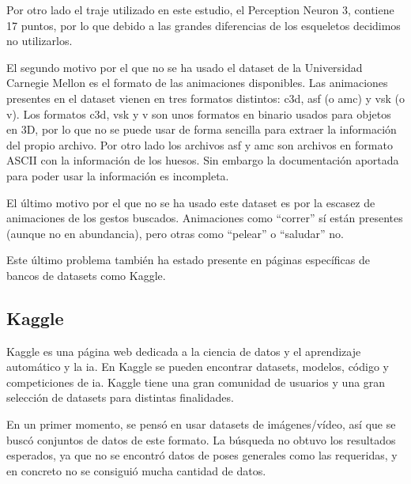 Por otro lado el traje utilizado en este estudio, el Perception Neuron 3, contiene 17 puntos, por lo que debido a las grandes diferencias de los esqueletos decidimos no utilizarlos.

El segundo motivo por el que no se ha usado el dataset de la Universidad Carnegie Mellon es el formato de las animaciones disponibles.
Las animaciones presentes en el dataset vienen en tres formatos distintos: c3d, asf (o amc) y vsk (o v).
Los formatos c3d, vsk y v son unos formatos en binario usados para objetos en 3D, por lo que no se puede usar de forma sencilla para extraer la información del propio archivo.
Por otro lado los archivos asf y amc son archivos en formato ASCII con la información de los huesos. Sin embargo la documentación aportada para poder usar la información es incompleta.

El último motivo por el que no se ha usado este dataset es por la escasez de animaciones de los gestos buscados.
Animaciones como ``correr'' sí están presentes (aunque no en abundancia), pero otras como ``pelear'' o ``saludar'' no.

Este último problema también ha estado presente en páginas específicas de bancos de datasets como Kaggle.

\subsection{Kaggle}

Kaggle es una página web dedicada a la ciencia de datos y el aprendizaje automático y la \gls{ia}. En Kaggle se pueden encontrar datasets, modelos, código y competiciones de \gls{ia}. Kaggle tiene una gran comunidad de usuarios y una gran selección de datasets para distintas finalidades.

En un primer momento, se pensó en usar datasets de imágenes/vídeo, así que se buscó conjuntos de datos de este formato. La búsqueda no obtuvo los resultados esperados, ya que no se encontró datos de poses generales como las requeridas, y en concreto no se consiguió mucha cantidad de datos.


